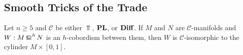 \subsection{Smooth Tricks of the Trade}

\begin{theorem}[$h$-cobordism]\label{thm:h-cobordism}
  Let $n\geq 5$ and $\mathscr{C}$ be either $\Top$, $\mathbf{PL}$, or $\mathbf{Diff}$. If $M$ and $N$ are $\mathscr{C}$-manifolds and $W : M \hbord N$ is an $h$-cobordism between them, then $W$ is $\mathscr{C}$-isomorphic to the cylinder $M\times [0,1]$.
\end{theorem}


%
%
%
%
%
%
%
%
%
%
%
%
